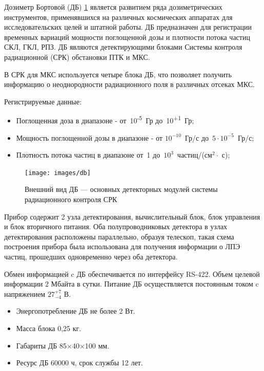 Дозиметр Бортовой (ДБ) \ref{fig:db} является развитием ряда дозиметрических инструментов, применявшихся на различных космических аппаратах для исследовательских целей и штатной работы. ДБ предназначен для регистрации временных вариаций мощности поглощенной дозы и плотности потока частиц СКЛ, ГКЛ, РПЗ. ДБ являются детектирующими блоками Системы контроля радиационной (СРК) обстановки ПТК и МКС.

В СРК для МКС используется четыре блока ДБ, что позволяет получить информацию о неоднородности радиационного поля в различных отсеках МКС. 

Регистрируемые данные:
\begin{itemize}
	\item 
	Поглощенная доза в диапазоне - от~10\textsuperscript{-5}~Гр  до~10\textsuperscript{+1}~Гр;  
	\item  
	Мощность поглощенной дозы в диапазоне - от $10^{-10}$~Гр/с  до~$5\cdot10^{-5}$~Гр/с;
	\item  
	Плотность потока частиц в диапазоне от~1 до~$ 10^3 $~частиц/(см$^2\cdot$ с);    		
\end{itemize}



\begin{figure}
\centering
\texttt{[image: images/db]}
\caption{Внешний вид ДБ --- основных детекторных модулей системы радиационного контроля СРК}
\label{fig:db}
\end{figure}

Прибор содержит 2 узла детектирования, вычислительный блок, блок управления и блок вторичного питания. Оба полупроводниковых детектора в узлах детектирования расположены  параллельно,  образуя телескоп, такая схема построения прибора была использована для получения информации о ЛПЭ частиц, прошедших одновременно через оба детектора.         


Обмен информацией c ДБ обеспечивается по интерфейсу RS-422. Объем целевой информации 2 Мбайта в сутки. Питание ДБ осуществляется постоянным током c напряжением $ 27^{+7}_{-4} $ В. 

\begin{itemize}
\item Энергопотребление ДБ не более 2 Вт.
\item Масса блока 0,25 кг.
\item Габариты ДБ 85×40×100 мм. 
\item Ресурс ДБ  60000 ч, срок службы 12 лет.
\end{itemize}


